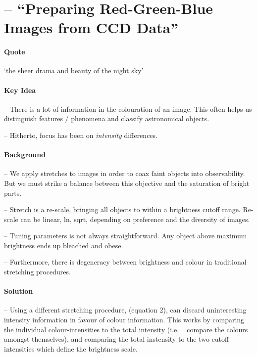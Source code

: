 \documentclass[letterpaper, 11pt]{article}
\begin{document}
\section{\citet{Lup++04} -- ``Preparing Red-Green-Blue Images from CCD Data''}
\label{sec:Lup++04notes}

\paragraph{Quote}

`the sheer drama and beauty of the night sky'

\paragraph{Key Idea}

-- There is a lot of information in the colouration of an image. This often helps us distinguish features / phenomena and classify astronomical objects.

-- Hitherto, focus has been on {\it intensity} differences.


\paragraph{Background}

-- We apply stretches to images in order to coax faint objects into observability. But we must strike a balance between this objective and the saturation of bright parts.

-- Stretch is a re-scale, bringing all objects to within a brightness cutoff range. Re-scale can be linear, ln, sqrt, depending on preference and the diversity of images.

-- Tuning parameters is not always straightforward. Any object above maximum brightness ends up bleached and obese.

-- Furthermore, there is degeneracy between brightness and colour in traditional stretching procedures.


\paragraph{Solution}

-- Using a different stretching procedure, (equation 2), can discard uninteresting intensity information in favour of colour information. This works by comparing the individual colour-intensities to the total intensity (i.e. ~ compare the colours amongst themselves), and comparing the total instensity to the two cutoff intensities which define the brightness scale.
\end{document}

